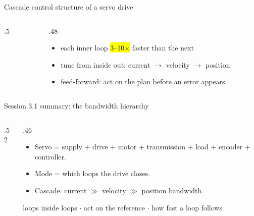 \documentclass[aspectratio=169,10pt]{beamer}
\newcommand{\src}[1]{\par\vspace{1mm}{\color{mkGray}\fontsize{6}{7}\selectfont #1\par}}
\begin{document}
\begin{frame}{Cascade control structure of a servo drive}
\begin{columns}[T]
\begin{column}{.5\textwidth}
\end{column}
\begin{column}{.48\textwidth}
\small
\begin{itemize}\setlength\itemsep{.3mm}
\item each inner loop \hl{3--10$\times$} faster than the next
\item tune from inside out: current $\to$ velocity $\to$ position
\item feed-forward: act on the plan before an error appears
\end{itemize}
\end{column}
\end{columns}
\src{[Ellis, 2012, ch.~17]; [Leonhard, 2001].}
\end{frame}

\begin{frame}{Session 3.1 summary: the bandwidth hierarchy}
\begin{columns}[T]
\begin{column}{.52\textwidth}
\centering
{}
\end{column}
\begin{column}{.46\textwidth}
\begin{keybox}
\begin{itemize}\setlength\itemsep{.4mm}
\item Servo = supply + drive + motor + transmission + load + encoder + controller.
\item Mode = which loops the drive closes.
\item Cascade: current $\gg$ velocity $\gg$ position bandwidth.
\end{itemize}
\end{keybox}
\begin{defbox}
 loops inside loops $\cdot$  act on the reference $\cdot$  how fast a loop follows
\end{defbox}
\end{column}
\end{columns}
\end{frame}
\end{document}
